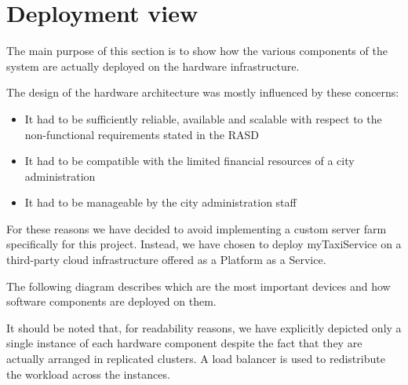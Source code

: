 \begin{figure}[H]
\centering
{}
\end{figure}
\pagebreak
\section{Deployment view}
The main purpose of this section is to show how the various components of the system are actually deployed on the hardware infrastructure.

The design of the hardware architecture was mostly influenced by these concerns: 
\begin{itemize}
	\item It had to be sufficiently reliable, available and scalable with respect to the non-functional requirements stated in the RASD
	\item It had to be compatible with the limited financial resources of a city administration 
	\item It had to be manageable by the city administration staff 
\end{itemize} 

For these reasons we have decided to avoid implementing a custom server farm specifically for this project. Instead, we have chosen to deploy myTaxiService on a third-party cloud infrastructure offered as a Platform as a Service.

The following diagram describes which are the most important devices and how software components are deployed on them.

It should be noted that, for readability reasons, we have explicitly depicted only a single instance of each hardware component despite the fact that they are actually arranged in replicated clusters. A load balancer is used to redistribute the workload across the instances.
\begin{landscape}

\end{landscape}

